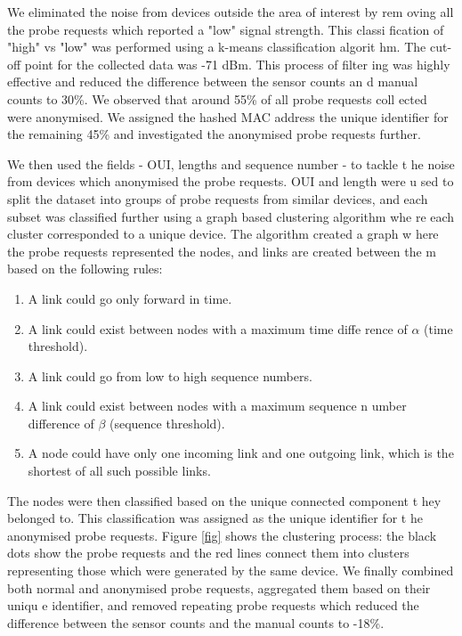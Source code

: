 \documentclass[11t, a4paper, twocolumn]{article}
\begin{document}
	We eliminated the noise from devices outside the area of interest by rem
oving all the probe requests which reported a "low" signal strength. This classi
fication of "high" vs "low" was performed using a k-means classification algorit
hm. The cut-off point for the collected data was -71 dBm. This process of filter
ing was highly effective and reduced the difference between the sensor counts an
d manual counts to 30\%. We observed that around 55\% of all probe requests coll
ected were anonymised. We assigned the hashed MAC address the unique identifier 
for the remaining 45\% and investigated the anonymised probe requests further.

	We then used the fields - OUI, lengths and sequence number - to tackle t
he noise from devices which anonymised the probe requests. OUI and length were u
sed to split the dataset into groups of probe requests from similar devices, and
 each subset was classified further using a graph based clustering algorithm whe
re each cluster corresponded to a unique device. The algorithm created a graph w
here the probe requests represented the nodes, and links are created between the
m based on the following rules: 
		
	\begin{enumerate}
		\item A link could go only forward in time. 
		\item A link could exist between nodes with a maximum time diffe
rence of $\alpha$ (time threshold).
		\item A link could go from low to high sequence numbers.
		\item A link could exist between nodes with a maximum sequence n
umber difference of $\beta$ (sequence threshold).
		\item A node could have only one incoming link and one outgoing 
link, which is the shortest of all such possible links.
	\end{enumerate}

	The nodes were then classified based on the unique connected component t
hey belonged to. This classification was assigned as the unique identifier for t
he anonymised probe requests. Figure \ref{fig} shows the clustering process: the
 black dots show the probe requests and the red lines connect them into clusters
 representing those which were generated by the same device. We finally combined
 both normal and anonymised probe requests, aggregated them based on their uniqu
e identifier, and removed repeating probe requests which reduced the difference 
between the sensor counts and the manual counts to -18\%.
\end{document}
